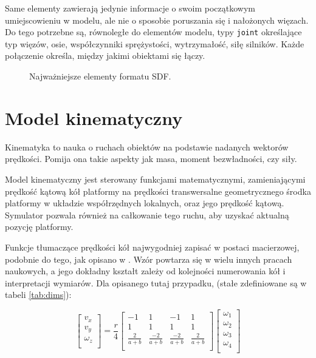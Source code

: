 	Same elementy zawierają jedynie informacje o swoim początkowym umiejscowieniu w modelu, ale nie o sposobie poruszania się i nałożonych więzach.
	Do tego potrzebne są, równoległe do elementów modelu, typy \texttt{joint} określające typ więzów, osie, współczynniki sprężystości, wytrzymałość, siłę silników.
	Każde połączenie określa, między jakimi obiektami się łączy.
	
	\begin{figure}[H]
	\caption{Najważniejsze elementy formatu SDF.}
	\label{fig:sdf_dir}
	\end{figure} 
	
\section{Model kinematyczny}
	\label{sec:pseudovelma}
	Kinematyka to nauka o ruchach obiektów na podstawie nadanych wektorów prędkości.
	Pomija ona takie aspekty jak masa, moment bezwładności, czy siły.
	
	Model kinematyczny jest sterowany funkcjami matematycznymi, 
	zamieniającymi prędkość kątową kół platformy na prędkości transwersalne geometrycznego środka platformy w układzie współrzędnych lokalnych, oraz jego prędkość kątową. 
	Symulator pozwala również na całkowanie tego ruchu, aby uzyskać aktualną pozycję platformy.
	
	Funkcje tłumaczące prędkości kół najwygodniej zapisać w postaci macierzowej, podobnie do tego, jak opisano w \cite{wheels}. 
	Wzór powtarza się w wielu innych pracach naukowych, a jego dokładny kształt zależy od kolejności numerowania kół i interpretacji wymiarów.
	Dla opisanego tutaj przypadku, (stałe zdefiniowane są w tabeli \ref{tab:dims}):
	
	\begin{equation}
	\begin{bmatrix}
	v_x \\
	v_y \\
	\omega_z \\
	\end{bmatrix}
	=
	\frac{r}{4}
	\begin{bmatrix}
	-1 & 1 & -1 & 1 \\
	1 & 1 & 1 & 1 \\
	\frac{2}{a+b} & \frac{-2}{a+b} & \frac{-2}{a+b} & \frac{2}{a+b} \\
	\end{bmatrix}
	\begin{bmatrix}
	\omega_1 \\
	\omega_2 \\
	\omega_3 \\
	\omega_4 \\
	\end{bmatrix}
	\end{equation}
	
